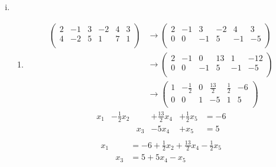 \documentclass{article}
\begin{document}
\begin{enumerate}[(i)]
\newpage
\item
  \begin{enumerate}
  \item
    \begin{align*}
      \left(
      \begin{array}{ccccc|c}
        2 & -1 & 3 & -2  & 4 & 3 \\
        4 & -2 & 5 & 1   & 7 & 1 \\
      \end{array}
      \right)
      &\rightarrow
      \left(
      \begin{array}{ccccc|c}
        2 & -1 & 3  & -2  & 4  & 3  \\
        0 & 0  & -1 & 5   & -1 & -5 \\
      \end{array}
      \right) \\
      &\rightarrow
      \left(
      \begin{array}{ccccc|c}
        2 & -1 & 0  & 13  & 1  & -12 \\
        0 & 0  & -1 & 5   & -1 & -5   \\
      \end{array}
      \right) \\
      &\rightarrow
      \left(
      \begin{array}{ccccc|c}
        1 & -\frac{1}{2} & 0 & \frac{13}{2} & \frac{1}{2} & -6 \\
        0 & 0            & 1 & -5           & 1           & 5  \\
      \end{array}
      \right)
    \end{align*}
    \[
      \begin{array}{llllll}
        x_1 & -\frac{1}{2} x_2 &     &+ \frac{13}{2}x_4 &+ \frac{1}{2}x_5 &= -6 \\
            &                  & x_3 &- 5x_4            &+ x_5            &= 5  \\
      \end{array}
    \]
    \[
      \begin{array}{lll}
        x_1 &     &= -6 + \frac{1}{2} x_2 + \frac{13}{2}x_4 - \frac{1}{2}x_5 \\
            & x_3 &= 5 + 5x_4 - x_5                                          \\
      \end{array}
    \]


\end{enumerate}
\end{enumerate}
\end{document}
